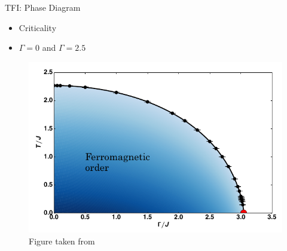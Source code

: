 \begin{frame}{TFI: Phase Diagram}
    \begin{minipage}{0.25\textwidth}
        \begin{itemize}
            \item Criticality
            \item $\Gamma=0$ and $\Gamma=2.5$
        \end{itemize}
    \end{minipage}
    \begin{minipage}{0.74\textwidth}
        \begin{figure}
            \centering
            \includegraphics[width=\linewidth]{../Figuren/phsyics/2disingphase.png}
            \caption*{Figure taken from \cite{Hesselmann2016}  }
        \end{figure}
    \end{minipage}
\end{frame}

